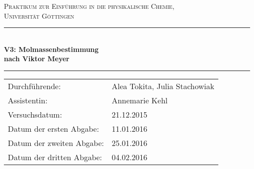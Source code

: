 \documentclass[12pt,a4paper,titlepage,headinclude,bibtotoc]{scrartcl}
\begin{document}
\begin{titlepage}
\centering
\textsc{\Large Praktikum zur Einführung in die physikalische Chemie,\\[1.5ex] Universität Göttingen}

\vspace*{2cm}

\rule{\textwidth}{1pt}\\[0.5cm]
{\huge \bfseries
  V3: Molmassenbestimmung\\[1.5ex]
  nach Viktor Meyer}\\[0.5cm]
\rule{\textwidth}{1pt}

\vspace*{1cm}


\begin{Large}
\begin{tabular}{ll}
Durchführende: &  Alea Tokita, Julia Stachowiak\\
Assistentin: & Annemarie Kehl\\
 Versuchsdatum: & 21.12.2015\\
 Datum der ersten Abgabe: & 11.01.2016\\
 Datum der zweiten Abgabe: & 25.01.2016      \\
 Datum der dritten Abgabe: & 04.02.2016\\
\end{tabular}
\end{Large}

\vspace*{1.5cm}

\begin{Large}
\end{Large}

\end{titlepage}

\tableofcontents

\newpage
\end{document}
